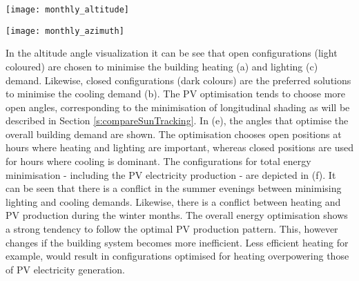 	\begin{figure*}
		\begin{center}
		\texttt{[image: monthly\_altitude]}
		\caption{Carpet plots detailing the optimal altitude angles to minimise the (a) heating demand, (b) cooling demand, (c) lighting demand, and (d) maximise PV electricity production. Figure (e) details the combinations for optimum building thermal management without PV production, (f) also includes the PV production. Small angles correspond to closed positions, whereas large angles represent open positions. The corresponding azimuth angles for each hour can be seen in the following Figure (\ref{fig:monthly_azimuth}).}
		\label{fig:monthly_altitude}
		\end{center}
	\end{figure*}

	\begin{figure*}
		\begin{center}
		\texttt{[image: monthly\_azimuth]}
		\caption{Carpet plots detailing the optimal azimuth angles to minimise the (a) heating demand, (b) cooling demand, (c) lighting demand, and (d) maximise PV electricity production. Figure (e) details the combinations for optimum building thermal management without PV production, (f) also includes the PV production. Negative angles correspond to the panels facing west, whereas positive angles represent east-facing panels. The corresponding altitude angles for each hour can be seen in the previous Figure (\ref{fig:monthly_altitude}).}
		\label{fig:monthly_azimuth}
		\end{center}
	\end{figure*}

	In the altitude angle visualization it can be see that open configurations (light coloured) are chosen to minimise the building heating (a) and lighting (c) demand. Likewise, closed configurations (dark colours) are the preferred solutions to minimise the cooling demand (b). The PV optimisation tends to choose more open angles, corresponding to the minimisation of longitudinal shading as will be described in Section \ref{s:compareSunTracking}. In (e), the angles that optimise the overall building demand are shown. The optimisation chooses open positions at hours where heating and lighting are important, whereas closed positions are used for hours where cooling is dominant. The configurations for total energy minimisation - including the PV electricity production - are depicted in (f). It can be seen that there is a conflict in the summer evenings between minimising lighting and cooling demands. Likewise, there is a conflict between heating and PV production during the winter months. The overall energy optimisation shows a strong tendency to follow the optimal PV production pattern. This, however changes if the building system becomes more inefficient. Less efficient heating for example, would result in configurations optimised for heating overpowering those of PV electricity generation.

